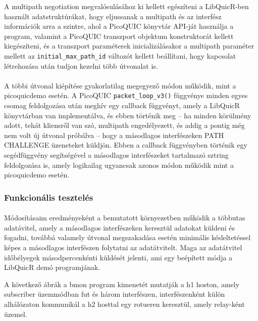 \documentclass[a4paper,oneside]{article}
\begin{document}
A multipath negotiation megvalósulásához ki kellett egészíteni a LibQuicR-ben
használt adatstruktúrákat, hogy eljussanak a multipath és az interfész információk
arra a szintre, ahol a PicoQUIC könyvtár API-ját használja a program, valamint 
a PicoQUIC transzport objektum konstruktorát 
kellett kiegészíteni, és a transzport paraméterek inicializálásakor a multipath paraméter mellett az 
  \texttt{initial\_max\_path\_id}
változót kellett beállítani, hogy kapcsolat létrehozása után tudjon kezelni több útvonalat is.

\paragraph{}

A többi útvonal kiépítése gyakorlatilag megegyező módon működik, mint a picoquicdemo esetén. A PicoQUIC 
  \texttt{packet\_loop\_v3()}
függvénye minden egyes csomag feldolgozása után meghív egy callback függvényt, amely a LibQuicR könyvtárban van 
implementálva, és ebben történik meg – ha minden körülmény adott, tehát kliensről van szó, 
multipath engedélyezett, és addig a pontig még nem volt új útvonal próbálva – hogy a másodlagos interfészeken PATH CHALLENGE üzeneteket küldjön.
Ebben a callback függvényben történik egy segédfüggvény segítségével a másodlagos interfészeket tartalmazó sztring feldolgozása is, amely logikailag
ugyancsak azonos módon működik mint a picoquicdemo esetén.


\subsubsection{Funkcionális tesztelés}
\paragraph{}

Módosításaim eredményeként a bemutatott környezetben működik a többutas adatávitel, 
amely a másodlagos interfészeken keresztül adatokat küldeni és fogadni, továbbá valamely útvonal megszakadása esetén
minimális késleltetéssel képes a másodlagos interfészen folytatni az adatátvitelt.
Maga az adatátvitel időbélyegek másodpercenkénti küldését jelenti, ami egy beépített módja a LibQuicR demó programjának.

A következő ábrák a bmon program kimenetét mutatják a h1 hoston, amely subscriber üzemmódban fut és három interfészen, interfészenként
külön alhálózaton kommunikál a h2 hosttal egy rotueren keresztül, amely relay-ként üzemel.
\end{document}
